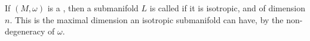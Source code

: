 \documentclass[12pt]{article}
\begin{document}
If $(M,\omega)$ is a , then a submanifold $L$ is called {\em {}}
if it is isotropic, and of dimension $n$. This is the maximal dimension an isotropic submanifold can have, by the non-degeneracy of $\omega$.
\end{document}
